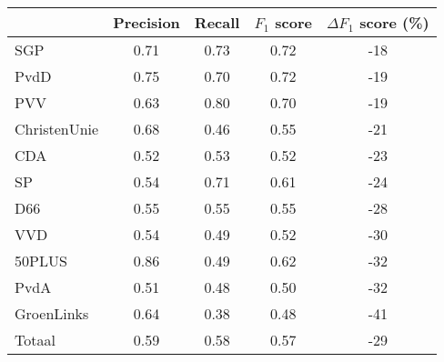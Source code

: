 \begin{tabular}{lcccc}
\toprule
{} &  Precision &  Recall &  $F_1$ score &  $\Delta F_1$ score (\%) \\
\midrule
SGP          &       0.71 &    0.73 &      0.72 & -18 \\
PvdD         &       0.75 &    0.70 &      0.72 & -19 \\
PVV          &       0.63 &    0.80 &      0.70 & -19 \\
ChristenUnie &       0.68 &    0.46 &      0.55 & -21 \\
CDA          &       0.52 &    0.53 &      0.52 & -23 \\
SP           &       0.54 &    0.71 &      0.61 & -24 \\
D66          &       0.55 &    0.55 &      0.55 & -28 \\
VVD          &       0.54 &    0.49 &      0.52 & -30 \\
50PLUS       &       0.86 &    0.49 &      0.62 & -32 \\
PvdA         &       0.51 &    0.48 &      0.50 & -32 \\
GroenLinks   &       0.64 &    0.38 &      0.48 & -41 \\
\midrule
Totaal       &       0.59 &    0.58 &      0.57 &        -29 \\
\bottomrule
\end{tabular}
